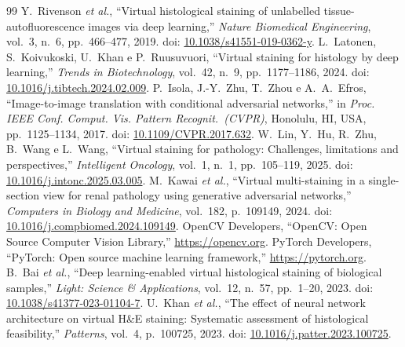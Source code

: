 \documentclass[a4paper,10pt]{article}
\begin{document}
\appendix
\begin{thebibliography}{99}
 Y.~Rivenson \emph{et al.}, ``Virtual histological staining of unlabelled tissue-autofluorescence images via deep learning,'' \emph{Nature Biomedical Engineering}, vol.~3, n.~6, pp.~466--477, 2019. doi: \href{https://doi.org/10.1038/s41551-019-0362-y}{10.1038/s41551-019-0362-y}.
 L.~Latonen, S.~Koivukoski, U.~Khan e P.~Ruusuvuori, ``Virtual staining for histology by deep learning,'' \emph{Trends in Biotechnology}, vol.~42, n.~9, pp.~1177--1186, 2024. doi: \href{https://doi.org/10.1016/j.tibtech.2024.02.009}{10.1016/j.tibtech.2024.02.009}.
 P.~Isola, J.-Y.~Zhu, T.~Zhou e A.~A.~Efros, ``Image-to-image translation with conditional adversarial networks,'' in \emph{Proc. IEEE Conf. Comput. Vis. Pattern Recognit.~(CVPR)}, Honolulu, HI, USA, pp.~1125--1134, 2017. doi: \href{https://doi.org/10.1109/CVPR.2017.632}{10.1109/CVPR.2017.632}.
 W.~Lin, Y.~Hu, R.~Zhu, B.~Wang e L.~Wang, ``Virtual staining for pathology: Challenges, limitations and perspectives,'' \emph{Intelligent Oncology}, vol.~1, n.~1, pp.~105--119, 2025. doi: \href{https://doi.org/10.1016/j.intonc.2025.03.005}{10.1016/j.intonc.2025.03.005}.
 M.~Kawai \emph{et al.}, ``Virtual multi-staining in a single-section view for renal pathology using generative adversarial networks,'' \emph{Computers in Biology and Medicine}, vol.~182, p.~109149, 2024. doi: \href{https://doi.org/10.1016/j.compbiomed.2024.109149}{10.1016/j.compbiomed.2024.109149}.
 OpenCV Developers, ``OpenCV: Open Source Computer Vision Library,'' \url{https://opencv.org}.
 PyTorch Developers, ``PyTorch: Open source machine learning framework,'' \url{https://pytorch.org}.
 B.~Bai \emph{et al.}, ``Deep learning-enabled virtual histological staining of biological samples,'' \emph{Light: Science \& Applications}, vol.~12, n.~57, pp.~1--20, 2023. doi: \href{https://doi.org/10.1038/s41377-023-01104-7}{10.1038/s41377-023-01104-7}.
 U.~Khan \emph{et al.}, ``The effect of neural network architecture on virtual H\&E staining: Systematic assessment of histological feasibility,'' \emph{Patterns}, vol.~4, p.~100725, 2023. doi: \href{https://doi.org/10.1016/j.patter.2023.100725}{10.1016/j.patter.2023.100725}.
\end{thebibliography}
\end{document}
